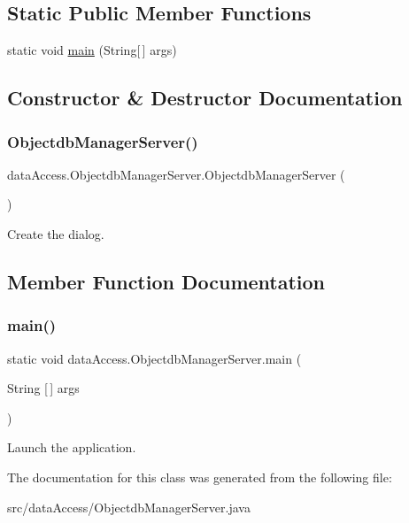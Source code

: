 \subsection*{Static Public Member Functions}
\begin{DoxyCompactItemize}
\item 
static void \mbox{\hyperlink{classdata_access_1_1_objectdb_manager_server_a2e0f5eddf461be78de905ca56e4295f9}{main}} (String\mbox{[}$\,$\mbox{]} args)
\end{DoxyCompactItemize}


\subsection{Constructor \& Destructor Documentation}
\mbox{\label{classdata_access_1_1_objectdb_manager_server_a6aac62b0bbbebbb54d3105d5820c0061}} 
\subsubsection{\texorpdfstring{ObjectdbManagerServer()}{ObjectdbManagerServer()}}
{\footnotesize\ttfamily data\+Access.\+Objectdb\+Manager\+Server.\+Objectdb\+Manager\+Server (\begin{DoxyParamCaption}{ }\end{DoxyParamCaption})}

Create the dialog. 

\subsection{Member Function Documentation}
\mbox{\label{classdata_access_1_1_objectdb_manager_server_a2e0f5eddf461be78de905ca56e4295f9}} 
\subsubsection{\texorpdfstring{main()}{main()}}
{\footnotesize\ttfamily static void data\+Access.\+Objectdb\+Manager\+Server.\+main (\begin{DoxyParamCaption}\item[{String \mbox{[}$\,$\mbox{]}}]{args }\end{DoxyParamCaption})\hspace{0.3cm}{\ttfamily [static]}}

Launch the application. 

The documentation for this class was generated from the following file\+:\begin{DoxyCompactItemize}
\item 
src/data\+Access/Objectdb\+Manager\+Server.\+java\end{DoxyCompactItemize}
